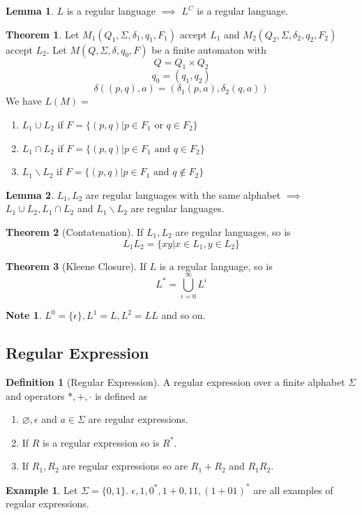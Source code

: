 \documentclass[10pt, a4paper]{extarticle}
\theoremstyle{definition}
\newtheorem{thm}{Theorem}
\newtheorem{lem}{Lemma}[thm]
\newtheorem{defn}{Definition}
\newtheorem{eg}{Example}
\newtheorem*{note*}{Note}
\begin{document}
\begin{lem}
	$L$ is a regular language $\implies$ $L^C$ is a regular language.
\end{lem}

\begin{thm}
	Let $M_1(Q_1,\Sigma,\delta_1,q_1,F_1)$ accept $L_1$ and $M_2(Q_2,\Sigma,\delta_2,q_2,F_2)$ accept $L_2$. Let $M(Q,\Sigma,\delta,q_0,F)$ be a finite automaton with
	\[Q=Q_1\times Q_2\]\[q_0=(q_1,q_2)\]\[\delta((p,q),a)=(\delta_1(p,a),\delta_2(q,a))\]
	We have $L(M)=$
	\begin{enumerate}
		\item $L_1\cup L_2$ if $F=\{(p,q)|p\in F_1\text{ or }q\in F_2\}$
		\item $L_1\cap L_2$ if $F=\{(p,q)|p\in F_1\text{ and }q\in F_2\}$
		\item $L_1\backslash L_2$ if $F=\{(p,q)|p\in F_1\text{ and }q\notin F_2\}$
	\end{enumerate}
\end{thm}
\begin{lem}
	$L_1,L_2$ are regular languages with the same alphabet $\implies$ $L_1\cup L_2, L_1\cap L_2$ and $L_1\backslash L_2$ are regular languages.
\end{lem}

\begin{thm}[Contatenation]
	If $L_1,L_2$ are regular languages, so is
	\[L_1L_2=\{xy|x\in L_1,y\in L_2\}\]
\end{thm}

\begin{thm}[Kleene Closure]
	If $L$ is a regular language, so is
	\[L^*=\bigcup_{i=0}^{\infty}L^i\]
\end{thm}
\begin{note*}
	$L^0=\{\epsilon\},L^1=L,L^2=LL$ and so on.
\end{note*}
\subsection{Regular Expression}
\begin{defn}[Regular Expression]
	A regular expression over a finite alphabet $\Sigma$ and operators $*,+,\cdot$  is defined as
	\begin{enumerate}
		\item $\varnothing,\epsilon$ and $a\in\Sigma$ are regular expressions.
		\item If $R$ is a regular expression so is $R^*$.
		\item If $R_1,R_2$ are regular expressions so are $R_1+R_2$ and $R_1R_2$.
	\end{enumerate}
\end{defn}
\begin{eg}
	Let $\Sigma=\{0,1\}$.
	$\epsilon,1,0^*,1+0,11,(1+01)^*$ are all examples of regular expressions.
\end{eg}
\end{document}
